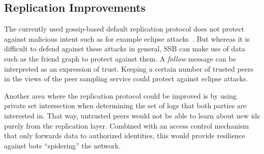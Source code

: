 \documentclass[9pt,sigconf]{acmart}
\begin{document}



\subsection{Replication Improvements}

The currently used gossip-based default replication protocol does not protect against malicious intent such as for example eclipse attacks~\cite{singh2006eclipse}. But whereas it is difficult to defend against these attacks in general, SSB can make use of data such as the friend graph to protect against them. A \textit{follow} message can be interpreted as an expression of trust. Keeping a certain number of trusted peers in the views of the peer sampling service could protect against eclipse attacks.

Another area where the replication protocol could be improved is by using private set intersection when determining the set of logs that both parties are interested in. That way, untrusted peers would not be able to learn about new ids purely from the replication layer. Combined with an access control mechanism that only forwards data to authorized identities, this would provide resilience against bots ``spidering'' the network.
\end{document}

